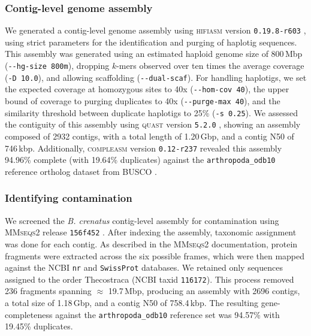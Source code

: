 \subsubsection*{Contig-level genome assembly}

We generated a contig-level genome assembly using \textsc{hifiasm} version
\texttt{0.19.8-r603} \citep{cheng_haplotype-resolved_2021,cheng_haplotype-resolved_2022},
using strict parameters for the identification and purging of haplotig sequences.
This assembly was generated using an estimated haploid genome size of 800\,Mbp
(\texttt{-{}-hg-size 800m}), dropping $k$-mers observed over ten times the average coverage
(\texttt{-D 10.0}), and allowing scaffolding (\texttt{-{}-dual-scaf}).
For handling haplotigs, we set the expected coverage at homozygous sites to
40x (\texttt{-{}-hom-cov 40}), the upper bound of coverage to purging duplicates to 40x
(\texttt{-{}-purge-max 40}), and the similarity threshold between duplicate haplotigs
to 25\% (\texttt{-s 0.25}).
We assessed the contiguity of this assembly using \textsc{quast} version \texttt{5.2.0}
\citep{gurevich_quast_2013}, showing an assembly composed of \num{2932} contigs, with a total
length of 1.20\,Gbp, and a contig N50 of 746\,kbp.
Additionally, \textsc{compleasm} version \texttt{0.12-r237} \citep{huang_compleasm_2023}
revealed this assembly 94.96\% complete (with 19.64\% duplicates) against the
\texttt{arthropoda\_odb10} reference ortholog dataset from \textsc{BUSCO}
\citep{simao_busco_2015,manni_busco_2021,tegenfeldt_orthodb_2025}.

\subsubsection*{Identifying contamination}

We screened the \textit{B. crenatus} contig-level assembly for contamination using
\textsc{MMseqs2} release \texttt{15\-6f452} \citep{steinegger_mmseqs2_2017}.
After indexing the assembly, taxonomic assignment was done for each contig.
As described in the \textsc{MMseqs2} documentation, protein fragments were extracted
across the six possible frames, which were then mapped against the NCBI \texttt{nr} and
\texttt{SwissProt} databases.
We retained only sequences assigned to the order Thecostraca (NCBI taxid
\texttt{116172}).
This process removed 236 fragments spanning $\approx$ 19.7\,Mbp, producing an assembly
with \num{2696} contigs, a total size of 1.18\,Gbp, and a contig N50 of 758.4\,kbp.
The resulting gene-completeness against the \texttt{arthropoda\_odb10} reference
set was 94.57\% with 19.45\% duplicates.

